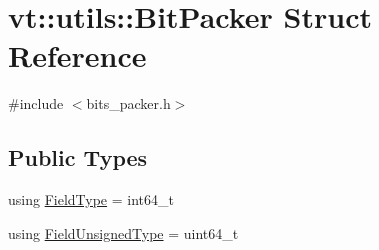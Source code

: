 \hypertarget{structvt_1_1utils_1_1_bit_packer}{}\section{vt\+:\+:utils\+:\+:Bit\+Packer Struct Reference}
\label{structvt_1_1utils_1_1_bit_packer}


{\ttfamily \#include $<$bits\+\_\+packer.\+h$>$}

\subsection*{Public Types}
\begin{DoxyCompactItemize}
\item 
using \hyperlink{structvt_1_1utils_1_1_bit_packer_a23024285425933c1f10c8fc3942f9beb}{Field\+Type} = int64\+\_\+t
\item 
using \hyperlink{structvt_1_1utils_1_1_bit_packer_a0bbc37c21a19e6c5311c6e9282a1e6f8}{Field\+Unsigned\+Type} = uint64\+\_\+t
\end{DoxyCompactItemize}
